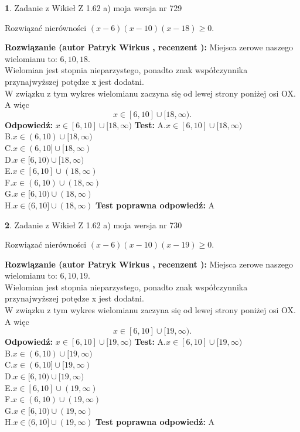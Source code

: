\documentclass[12pt, a4paper]{article}
\theoremstyle{definition} %
\newtheorem{zad}{}
\newcommand{\zadStart}[1]{\begin{zad}#1\newline}
\newcommand{\zadStop}{\end{zad}}
\newcommand{\rozwStart}[2]{\noindent \textbf{Rozwiązanie (autor #1 , recenzent #2): }\newline}
\newcommand{\rozwStop}{\newline}
\newcommand{\odpStart}{\noindent \textbf{Odpowiedź:}\newline}
\newcommand{\odpStop}{\newline}
\newcommand{\testStart}{\noindent \textbf{Test:}\newline}
\newcommand{\testStop}{\newline}
\newcommand{\kluczStart}{\noindent \textbf{Test poprawna odpowiedź:}\newline}
\newcommand{\kluczStop}{\newline}
\begin{document}
\zadStart{Zadanie z Wikieł Z 1.62 a) moja wersja nr 729}

Rozwiązać nierówności $(x-6)(x-10)(x-18)\ge0$.
\zadStop
\rozwStart{Patryk Wirkus}{}
Miejsca zerowe naszego wielomianu to: $6, 10, 18$.\\
Wielomian jest stopnia nieparzystego, ponadto znak współczynnika przy\linebreak najwyższej potędze x jest dodatni.\\ W związku z tym wykres wielomianu zaczyna się od lewej strony poniżej osi OX. A więc $$x \in [6,10] \cup [18,\infty).$$
\rozwStop
\odpStart
$x \in [6,10] \cup [18,\infty)$
\odpStop
\testStart
A.$x \in [6,10] \cup [18,\infty)$\\
B.$x \in (6,10) \cup [18,\infty)$\\
C.$x \in (6,10] \cup [18,\infty)$\\
D.$x \in [6,10) \cup [18,\infty)$\\
E.$x \in [6,10] \cup (18,\infty)$\\
F.$x \in (6,10) \cup (18,\infty)$\\
G.$x \in [6,10) \cup (18,\infty)$\\
H.$x \in (6,10] \cup (18,\infty)$
\testStop
\kluczStart
A
\kluczStop



\zadStart{Zadanie z Wikieł Z 1.62 a) moja wersja nr 730}

Rozwiązać nierówności $(x-6)(x-10)(x-19)\ge0$.
\zadStop
\rozwStart{Patryk Wirkus}{}
Miejsca zerowe naszego wielomianu to: $6, 10, 19$.\\
Wielomian jest stopnia nieparzystego, ponadto znak współczynnika przy\linebreak najwyższej potędze x jest dodatni.\\ W związku z tym wykres wielomianu zaczyna się od lewej strony poniżej osi OX. A więc $$x \in [6,10] \cup [19,\infty).$$
\rozwStop
\odpStart
$x \in [6,10] \cup [19,\infty)$
\odpStop
\testStart
A.$x \in [6,10] \cup [19,\infty)$\\
B.$x \in (6,10) \cup [19,\infty)$\\
C.$x \in (6,10] \cup [19,\infty)$\\
D.$x \in [6,10) \cup [19,\infty)$\\
E.$x \in [6,10] \cup (19,\infty)$\\
F.$x \in (6,10) \cup (19,\infty)$\\
G.$x \in [6,10) \cup (19,\infty)$\\
H.$x \in (6,10] \cup (19,\infty)$
\testStop
\kluczStart
A
\kluczStop
\end{document}
